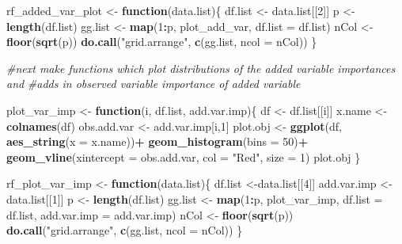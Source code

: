 \documentclass[12pt,twoside]{reedthesis}
\newenvironment{Shaded}{\begin{snugshade}}{\end{snugshade}}
\newcommand{\KeywordTok}[1]{\textcolor[rgb]{0.13,0.29,0.53}{\textbf{#1}}}
\newcommand{\DataTypeTok}[1]{\textcolor[rgb]{0.13,0.29,0.53}{#1}}
\newcommand{\DecValTok}[1]{\textcolor[rgb]{0.00,0.00,0.81}{#1}}
\newcommand{\StringTok}[1]{\textcolor[rgb]{0.31,0.60,0.02}{#1}}
\newcommand{\CommentTok}[1]{\textcolor[rgb]{0.56,0.35,0.01}{\textit{#1}}}
\newcommand{\ControlFlowTok}[1]{\textcolor[rgb]{0.13,0.29,0.53}{\textbf{#1}}}
\newcommand{\OperatorTok}[1]{\textcolor[rgb]{0.81,0.36,0.00}{\textbf{#1}}}
\newcommand{\NormalTok}[1]{#1}
\theoremstyle{definition}
\theoremstyle{definition}
\theoremstyle{definition}
\theoremstyle{remark}
\begin{document}
\begin{Shaded}
\begin{Highlighting}[]
{\NormalTok{rf_added_var_plot <-}\StringTok{ }\ControlFlowTok{function}\NormalTok{(data.list)\{}
\NormalTok{    df.list <-}\StringTok{ }\NormalTok{data.list[[}\DecValTok{2}\NormalTok{]]}
\NormalTok{    p <-}\StringTok{ }\KeywordTok{length}\NormalTok{(df.list)}
\NormalTok{    gg.list <-}\StringTok{ }\KeywordTok{map}\NormalTok{(}\DecValTok{1}\OperatorTok{:}\NormalTok{p, plot_add_var, }\DataTypeTok{df.list =}\NormalTok{ df.list)}
\NormalTok{    nCol <-}\StringTok{ }\KeywordTok{floor}\NormalTok{(}\KeywordTok{sqrt}\NormalTok{(p))}
    \KeywordTok{do.call}\NormalTok{(}\StringTok{"grid.arrange"}\NormalTok{, }\KeywordTok{c}\NormalTok{(gg.list, }\DataTypeTok{ncol =}\NormalTok{ nCol))}
\NormalTok{\}}

\CommentTok{#next make functions which plot distributions of the added variable importances and }
\CommentTok{#adds in observed variable importance of added variable}

\NormalTok{plot_var_imp <-}\StringTok{ }\ControlFlowTok{function}\NormalTok{(i, df.list, add.var.imp)\{}
\NormalTok{  df <-}\StringTok{ }\NormalTok{df.list[[i]]}
\NormalTok{  x.name <-}\StringTok{ }\KeywordTok{colnames}\NormalTok{(df)}
\NormalTok{  obs.add.var <-}\StringTok{ }\NormalTok{add.var.imp[i,}\DecValTok{1}\NormalTok{]}
\NormalTok{  plot.obj <-}\StringTok{ }\KeywordTok{ggplot}\NormalTok{(df, }\KeywordTok{aes_string}\NormalTok{(}\DataTypeTok{x =}\NormalTok{ x.name))}\OperatorTok{+}
\StringTok{    }\KeywordTok{geom_histogram}\NormalTok{(}\DataTypeTok{bins =} \DecValTok{50}\NormalTok{)}\OperatorTok{+}
\StringTok{    }\KeywordTok{geom_vline}\NormalTok{(}\DataTypeTok{xintercept =}\NormalTok{ obs.add.var, }\DataTypeTok{col =} \StringTok{"Red"}\NormalTok{, }\DataTypeTok{size =} \DecValTok{1}\NormalTok{)}
\NormalTok{  plot.obj}
\NormalTok{\}}

\NormalTok{rf_plot_var_imp <-}\StringTok{ }\ControlFlowTok{function}\NormalTok{(data.list)\{}
\NormalTok{ df.list  <-data.list[[}\DecValTok{4}\NormalTok{]]}
\NormalTok{ add.var.imp <-}\StringTok{ }\NormalTok{data.list[[}\DecValTok{1}\NormalTok{]]}
\NormalTok{ p <-}\StringTok{ }\KeywordTok{length}\NormalTok{(df.list)}
\NormalTok{ gg.list <-}\StringTok{ }\KeywordTok{map}\NormalTok{(}\DecValTok{1}\OperatorTok{:}\NormalTok{p, plot_var_imp, }\DataTypeTok{df.list =}\NormalTok{ df.list, }\DataTypeTok{add.var.imp =}\NormalTok{ add.var.imp)}
\NormalTok{ nCol <-}\StringTok{ }\KeywordTok{floor}\NormalTok{(}\KeywordTok{sqrt}\NormalTok{(p))}
 \KeywordTok{do.call}\NormalTok{(}\StringTok{"grid.arrange"}\NormalTok{, }\KeywordTok{c}\NormalTok{(gg.list, }\DataTypeTok{ncol =}\NormalTok{ nCol))}
\NormalTok{\}}

}
\end{Highlighting}
\end{Shaded}
\end{document}
